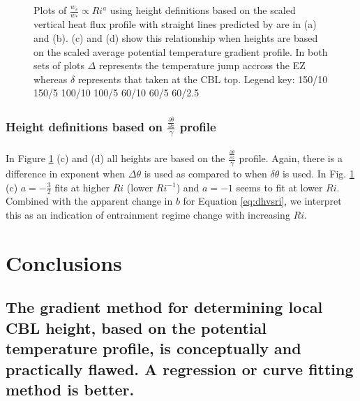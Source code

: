 \documentclass[referee]{svjour3}
\begin{document}
\begin{figure}[htbp]
\begin{minipage}[b]{0.5\linewidth}
        \end{minipage}
        \caption{Plots of $\frac{w_{e}}{w_{*}} \propto Ri^{a}$ using height definitions based on the scaled vertical heat flux profile with straight lines predicted by \cite{GarciaMellado} are in (a) and (b).  (c) and (d) show this relationship when heights are based on the scaled average potential temperature gradient profile. In both sets of plots $\Delta$ represents the temperature jump accross the EZ whereas $\delta$ represents that taken at the CBL top. Legend key:{\color{red} } 150/10  150/5 \hspace{2mm} {\color{black} } 100/10 \hspace{2mm} {\color{black} } 100/5 \hspace{2mm} {\color{offyellow} } 60/10 \hspace{2mm} {\color{offyellow} } 60/5 \hspace{2mm} {\color{offyellow} } 60/2.5}
        \label{fig:weinvri}
\end{figure}


\subsubsection{Height definitions based on $\frac{\frac{\partial \overline{\theta}}{\partial z}}{\gamma}$ profile}
In Figure \ref{fig:weinvri} (c) and (d) all heights are based on the $\frac{\frac{\partial \overline{\theta}}{\partial z}}{\gamma}$ profile.  Again, there is a difference in exponent when $\Delta \theta$ is used as compared to when $\delta \theta$ is used.  In Fig. \ref{fig:weinvri} (c) $a=-\frac{3}{2}$ fits at higher $Ri$ (lower $Ri^{-1}$) and $a=-1$ seems to fit at lower $Ri$.  Combined with the apparent change in $b$ for Equation \ref{eq:dhvsri}, we interpret this as an indication of entrainment regime change with increasing $Ri$.\\ 


\section{Conclusions}

\subsection{The gradient method for determining local CBL height, based on the potential temperature profile, is conceptually and practically flawed.  A regression or curve fitting method is better.}
\end{document}

